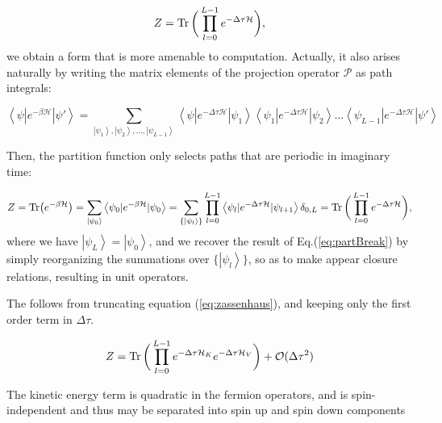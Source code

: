 \begin{equation}\label{eq:partBreak}
Z =  \operatorname{Tr} \bigg( \prod_{l=0}^{L-1} e^{-\Delta\tau \mathcal{H} } \bigg) ,
\end{equation}
we obtain a form that is more amenable to computation.
Actually, it also arises naturally by writing the matrix elements of the projection operator $\mathcal{P}$ as path integrals:

\begin{equation}
\left\langle \psi | e^{-\beta \mathcal{H} } | \psi' \right\rangle = \sum_{\left| \psi_1 \right\rangle, \left| \psi_2 \right\rangle,..., \left| \psi_{L-1} \right\rangle }  \left\langle \psi | e^{-\Delta \tau \mathcal{H} } | \psi_1 \right\rangle \left\langle \psi_1 | e^{-\Delta \tau \mathcal{H} } | \psi_2 \right\rangle ... \left\langle \psi_{L - 1} | e^{-\Delta \tau \mathcal{H} } | \psi' \right\rangle 
\end{equation}

Then, the partition function only selects paths that are periodic in imaginary time:

\begin{equation}
Z = \text{Tr} \big( e^{-\beta \mathcal{H} } \big) = \sum_{\left| \psi_0 \right\rangle} \left\langle \psi_0 | e^{-\beta \mathcal{H}} | \psi_0 \right\rangle = \sum_{\{ \left| \psi_l \right\rangle \}} \prod_{l = 0}^{L - 1} \left\langle \psi_{l} | e^{-\Delta \tau \mathcal{H} } | \psi_{l+1} \right\rangle \delta_{0, L} = \operatorname{Tr} \bigg( \prod_{l=0}^{L-1} e^{-\Delta\tau \mathcal{H} } \bigg) ,
\end{equation}
where we have $\left| \psi_L \right\rangle = \left| \psi_0 \right\rangle$, and we  recover the result of Eq.(\ref{eq:partBreak}) by simply reorganizing the summations over $\{ \left| \psi_l \right\rangle \}$, so as to make appear closure relations, resulting in unit operators.

The  follows from truncating equation (\ref{eq:zassenhaus}), and keeping only the first order term in $\Delta \tau$.

\begin{equation}\label{eq:Z_propagator}
Z = \operatorname{Tr} \bigg( \prod_{l=0}^{L-1} e^{-\Delta\tau \mathcal{H}_{K} } e^{-\Delta\tau \mathcal{H}_{V} } \bigg) + \mathcal{O}(\Delta \tau^2) 
\end{equation}

The kinetic energy term is quadratic in the fermion operators, and is spin-independent and thus may be separated into spin up and spin down components

